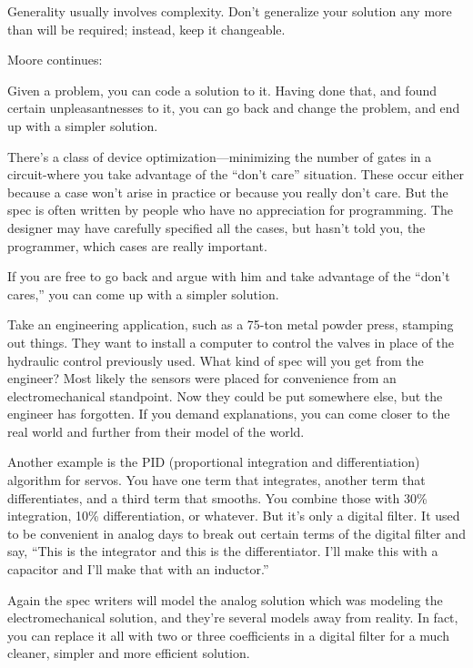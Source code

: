 \begin{tip}
Generality usually involves complexity. Don't generalize your solution any
more than will be required; instead, keep it changeable.
\end{tip}

\bigskip\blackline{2ex}
\noindent Moore continues:
\begin{tfquot}

Given a problem, you can code a solution to it. Having done that, and found
certain unpleasantnesses to it, you can go back and change the problem,
and end up with a simpler solution.

There's a class of device optimization---minimizing the number of gates in a
circuit-where you take advantage of the ``don't care'' situation. These
occur either because a case won't arise in practice or because you really
don't care. But the spec is often written by people who have no appreciation
for programming. The designer may have carefully specified all the cases,
but hasn't told you, the programmer, which cases are really important.

If you are free to go back and argue with him and take advantage of the
``don't cares,'' you can come up with a simpler solution.

Take an engineering application, such as a 75-ton metal powder press,
stamping out things. They want to install a computer to control the valves
in place of the hydraulic control previously used. What kind of spec will you
get from the engineer? Most likely the sensors were placed for convenience
from an electromechanical standpoint. Now they could be put somewhere
else, but the engineer has forgotten. If you demand explanations, you can
come closer to the real world and further from their model of the world.

Another example is the PID (proportional integration and differentiation)
algorithm for servos. You have one term that integrates, another term that
differentiates, and a third term that smooths. You combine those with
30\% integration, 10\% differentiation, or whatever. But it's only a digital
filter. It used to be convenient in analog days to break out certain terms of
the digital filter and say, ``This is the integrator and this is the
differentiator. I'll make this with a capacitor and I'll make that with an inductor.''

Again the spec writers will model the analog solution which was modeling
the electromechanical solution, and they're several models away from
reality. In fact, you can replace it all with two or three coefficients in a digital
filter for a much cleaner, simpler and more efficient solution.
\end{tfquot}
\blackline{2ex}

